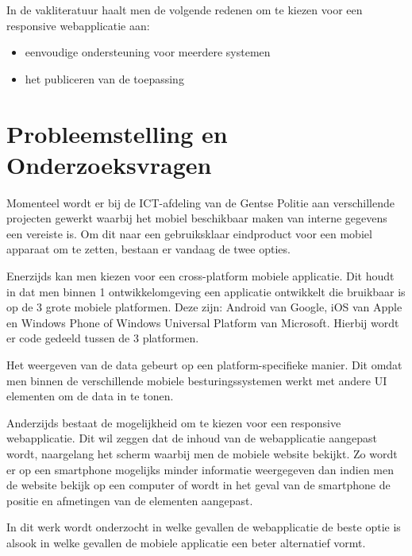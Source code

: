 In de vakliteratuur haalt men de volgende redenen om te kiezen voor een responsive webapplicatie aan:
\begin{itemize}
  \item{eenvoudige ondersteuning voor meerdere systemen}
  \item{het publiceren van de toepassing}
\end{itemize}



\section{Probleemstelling en Onderzoeksvragen}
\label{sec:onderzoeksvragen}


Momenteel wordt er bij de ICT-afdeling van de Gentse Politie aan verschillende projecten gewerkt waarbij het
mobiel beschikbaar maken van interne gegevens een vereiste is.
Om dit naar een gebruiksklaar eindproduct voor een mobiel apparaat om te zetten, bestaan er vandaag de twee opties.

Enerzijds kan men kiezen voor een cross-platform mobiele applicatie.
Dit houdt in dat men binnen 1 ontwikkelomgeving een applicatie ontwikkelt die bruikbaar is op de
3 grote mobiele platformen. Deze zijn: Android van Google, iOS van Apple en Windows Phone of
Windows Universal Platform van Microsoft.
Hierbij wordt er code gedeeld tussen de 3 platformen.

Het weergeven van de data gebeurt op een platform-specifieke manier.
Dit omdat men binnen de verschillende mobiele besturingssystemen werkt met andere UI elementen om de data in te tonen.

Anderzijds bestaat de mogelijkheid om te kiezen voor een responsive webapplicatie.
Dit wil zeggen dat de inhoud van de webapplicatie aangepast wordt,
 naargelang het scherm waarbij men de mobiele website bekijkt.
Zo wordt er op een smartphone mogelijks minder informatie weergegeven dan indien men de website bekijk op een computer of
wordt in het geval van de smartphone de positie en afmetingen van de elementen aangepast.

In dit werk wordt onderzocht in welke gevallen de webapplicatie de beste optie is alsook in welke gevallen de mobiele applicatie
een beter alternatief vormt.

